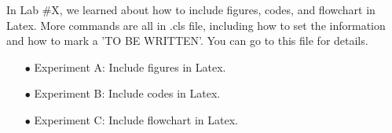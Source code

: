 \documentclass{LabReport}
\begin{document}
\makeCover

\setlength{\parskip}{0.2em} %
\fontsize{12}{1em} %
\setmainfont{Times New Roman} %
\justifying


\setlength{\parindent}{0em}
In Lab \#X, we learned about how to include figures, codes, and flowchart in Latex. More commands are all in .cls file, including how to set the information and how to mark a 'TO BE WRITTEN'. You can go to this file for details.
\setlength{\parindent}{1.5em}

\begin{itemize}[leftmargin=1em]
    \item [$\bullet$] Experiment A: Include figures in Latex.    
    \item [$\bullet$] Experiment B: Include codes in Latex.
    \item [$\bullet$] Experiment C: Include flowchart in Latex.
\end{itemize}






\end{document}
